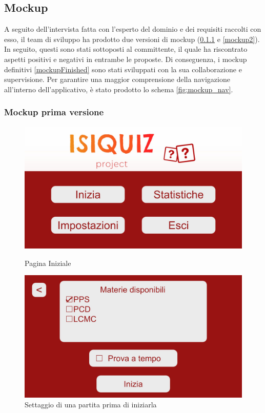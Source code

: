         \subsection{Mockup}
        \label{chap:Mockup}
    	A seguito dell'intervista fatta con l'esperto del dominio e dei requisiti raccolti con esso, il team di sviluppo ha prodotto due versioni di mockup (\ref{mockup1} e \ref{mockup2}). In seguito, questi sono stati sottoposti al committente, il quale ha riscontrato aspetti positivi e negativi in entrambe le proposte. Di conseguenza, i mockup definitivi \ref{mockupFinished} sono stati sviluppati con la sua collaborazione e supervisione. Per garantire una maggior comprensione della navigazione all'interno dell'applicativo, è stato prodotto lo schema \ref{fig:mockup_nav}.
     
        \subsubsection{Mockup prima versione}\label{mockup1}
        
        \begin{figure}[H]
          \centering
          \begin{minipage}[b]{0.48\textwidth}
            \includegraphics[width=\textwidth]{Images/mockup/home1.jpg}
            \caption{Pagina Iniziale}
            \label{fig:HomePage1}
          \end{minipage}
          \hfill
          \begin{minipage}[b]{0.48\textwidth}
            \includegraphics[width=\textwidth]{Images/mockup/start1.jpg}
            \caption{Settaggio di una partita prima di iniziarla}
            \label{fig:Start1}
          \end{minipage}
        \end{figure}

